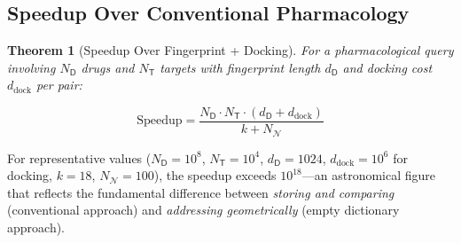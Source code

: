 \documentclass[11pt,twocolumn,a4paper]{article}
\newtheorem{theorem}{Theorem}[section]
\theoremstyle{definition}
\theoremstyle{remark}
\newcommand{\Drug}{\mathsf{D}}
\newcommand{\Target}{\mathsf{T}}
\begin{document}
\subsection{Speedup Over Conventional Pharmacology}

\begin{theorem}[Speedup Over Fingerprint + Docking]
\label{thm:speedup_pharm}
For a pharmacological query involving $N_\Drug$ drugs and $N_\Target$ targets with fingerprint length $d_\Drug$ and docking cost $d_{\mathrm{dock}}$ per pair:

\begin{equation}
\text{Speedup} = \frac{N_\Drug \cdot N_\Target \cdot (d_\Drug + d_{\mathrm{dock}})}{k + N_\mathcal{N}}
\end{equation}
\end{theorem}

For representative values ($N_\Drug = 10^8$, $N_\Target = 10^4$, $d_\Drug = 1024$, $d_{\mathrm{dock}} = 10^6$ for docking, $k = 18$, $N_\mathcal{N} = 100$), the speedup exceeds $10^{18}$---an astronomical figure that reflects the fundamental difference between \emph{storing and comparing} (conventional approach) and \emph{addressing geometrically} (empty dictionary approach).
\end{document}
